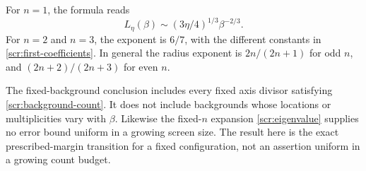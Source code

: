 For \(n=1\), the formula reads
\[
 L_\eta(\beta)\sim(3\eta/4)^{1/3}\beta^{-2/3}.
\]
For \(n=2\) and \(n=3\), the exponent is \(6/7\), with the
different constants in \eqref{scr:first-coefficients}.
In general the radius exponent is \(2n/(2n+1)\) for odd
\(n\), and \((2n+2)/(2n+3)\) for even \(n\).

The fixed-background conclusion includes every fixed axis divisor
satisfying \eqref{scr:background-count}. It does not
include backgrounds whose locations or multiplicities vary with
\(\beta\). Likewise the
fixed-\(n\) expansion \eqref{scr:eigenvalue} supplies no error
bound uniform in a growing screen size. The result here is the
exact prescribed-margin transition for a fixed configuration,
not an assertion uniform in a growing count budget.
